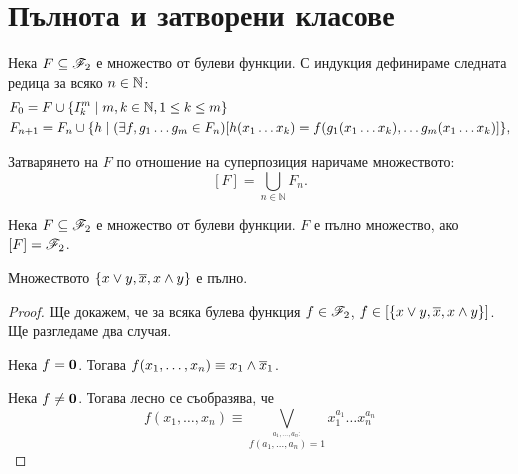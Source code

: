 \section{Пълнота и затворени класове}

\begin{dfn}
Нека $F\subseteq \mathscr{F}_2$ е множество от булеви функции. С
индукция дефинираме следната редица за всяко $n \in \mathbb{N}$:
\begin{align*}
  & F_0 = F\cup \{I^m_k \mid m,k\in\mathbb{N}, 1\leq k\leq m\}\\
  & F_{n+1} = F_n \cup \{h \mid (\exists f, g_1\dots g_m \in F_n)[h(x_1\dots x_k) =  f(g_1(x_1\dots x_k), \dots g_m(x_1\dots x_k)]\},
\end{align*}

Затварянето на $F$ по отношение на суперпозиция наричаме
множеството:
\[[F] = \bigcup_{n\in \mathbb{N}}F_n.\]

\end{dfn}



\begin{dfn}
  Нека $F\subseteq \mathscr{F}_2$ е множество от булеви функции. 
  $F$ е пълно множество, ако $[F] = \mathscr{F}_2$.
\end{dfn}

\begin{thm}[Бул]
  Множеството $\{x\vee y,\overline{x},x\wedge y\}$ е пълно.
\end{thm}
\begin{proof}
  Ще докажем, че за всяка булева функция $f \in \mathscr{F}_2$, $f \in [\{x\vee y, \overline{x}, x \wedge y\}]$.
  Ще разгледаме два случая.
  
  Нека $f = \bf{0}$. Тогава $f(x_1,\dots,x_n) \equiv x_1\wedge\overline{x}_1$.
  
  Нека $f \neq \bf{0}$. Тогава лесно се съобразява, че
  \[f(x_1,\dots,x_n) \equiv \bigvee_{\stackrel{a_1,\dots,a_n:}{f(a_1,\dots,a_n) = 1}} x^{a_1}_1\dots x^{a_n}_n\]
\end{proof}



